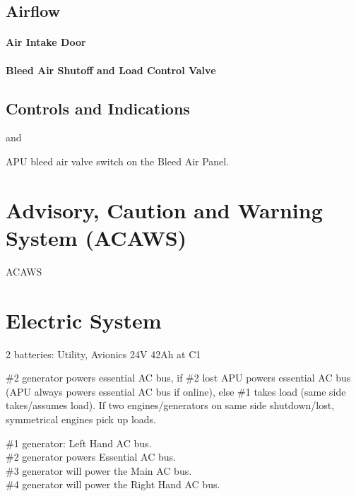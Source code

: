 \subsection{Airflow}

\paragraph*{Air Intake Door}
\label{par:air-intake-door}

\paragraph*{Bleed Air Shutoff and Load Control Valve}
\label{par:bleed-air-shutoff-and-load-control-valve}

\subsection{Controls and Indications}

 and 




APU bleed air valve switch on the Bleed Air Panel.

\section{Advisory, Caution and Warning System (ACAWS)}
\label{sec:acaws}

\gls{ACAWS}

\section{Electric System}

2 batteries: Utility, Avionics 24V 42Ah at C1

\#2 generator powers essential AC bus, if \#2 lost APU powers essential AC bus (APU always powers essential AC bus if online), else \#1 takes load (same side takes/assumes load). If two engines/generators on same side shutdown/lost, symmetrical engines pick up loads.

\#1 generator: Left Hand AC bus.\\
\#2 generator powers Essential AC bus.\\
\#3 generator will power the Main AC bus.\\
\#4 generator will power the Right Hand AC bus.

